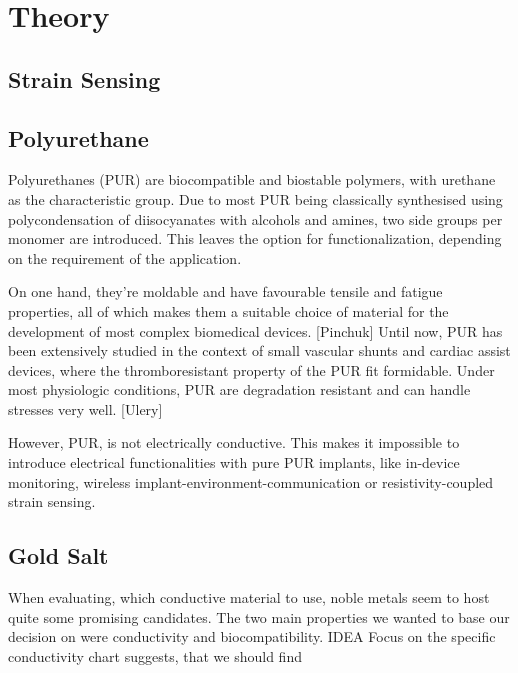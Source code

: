 \section{Theory}
\label{sec:Theory}

\subsection{Strain Sensing}



\subsection{Polyurethane}

Polyurethanes (PUR) are biocompatible and biostable polymers, with urethane as 
the characteristic group. Due to most PUR being classically synthesised using 
polycondensation of diisocyanates with alcohols and amines, two side groups per 
monomer are introduced. This leaves the option for functionalization, depending on the requirement of the application. 

On one hand, they're moldable and have favourable tensile and fatigue properties, all of which makes them a suitable choice of material for the development of most complex biomedical devices. [Pinchuk]
 Until now, PUR has been extensively studied in the context of small vascular shunts and cardiac assist devices, where the thromboresistant property of the PUR fit formidable. Under most physiologic conditions, PUR are degradation resistant and can handle stresses very well. [Ulery] 


However, PUR, is not electrically conductive. This makes it impossible to introduce electrical functionalities with pure PUR implants, like in-device monitoring, wireless implant-environment-communication or resistivity-coupled strain sensing.



\subsection{Gold Salt}
\label{subsec:GoldSalt}

When evaluating, which conductive material to use, noble metals seem to
 host quite some promising candidates. The two main properties we wanted to
  base our decision on were conductivity and biocompatibility.
  IDEA
    Focus on the specific conductivity chart suggests, that we should find 

